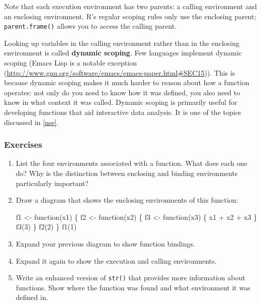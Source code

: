 \documentclass[oneside]{book}
\newenvironment{Shaded}{}{}
\newcommand{\KeywordTok} [1]{\textcolor[rgb]{0.00,0.44,0.13}{{#1}}}
\newcommand{\DecValTok}  [1]{\textcolor[rgb]{0.25,0.63,0.44}{{#1}}}
\newcommand{\StringTok}  [1]{\textcolor[rgb]{0.25,0.44,0.63}{{#1}}}
\newcommand{\NormalTok}  [1]{{#1}}
\renewcommand{\href}[2]{#2 (\url{#1})}
\renewcommand{\hyperref}[2][???]{\autoref{#1}}
\begin{document}
Note that each execution environment has two parents: a calling
environment and an enclosing environment. R's regular scoping rules only
use the enclosing parent; \texttt{parent.frame()} allows you to access
the calling parent.

Looking up variables in the calling environment rather than in the
enclosing environment is called \textbf{dynamic scoping}. Few languages
implement dynamic scoping (Emacs Lisp is a
\href{http://www.gnu.org/software/emacs/emacs-paper.html\#SEC15}{notable
exception}). This is because dynamic scoping makes it much harder to
reason about how a function operates: not only do you need to know how
it was defined, you also need to know in what context it was called.
Dynamic scoping is primarily useful for developing functions that aid
interactive data analysis. It is one of the topics discussed in
\hyperref[nse]{non-standard evaluation}.

\subsubsection{Exercises}\label{exercises-2}

\begin{enumerate}
\def\labelenumi{\arabic{enumi}.}
\item
  List the four environments associated with a function. What does each
  one do? Why is the distinction between enclosing and binding
  environments particularly important?
\item
  Draw a diagram that shows the enclosing environments of this function:

\begin{Shaded}
\begin{Highlighting}[]
\NormalTok{f1 <-}\StringTok{ }\NormalTok{function(x1) \{}
  \NormalTok{f2 <-}\StringTok{ }\NormalTok{function(x2) \{}
    \NormalTok{f3 <-}\StringTok{ }\NormalTok{function(x3) \{}
      \NormalTok{x1 +}\StringTok{ }\NormalTok{x2 +}\StringTok{ }\NormalTok{x3}
    \NormalTok{\}}
    \KeywordTok{f3}\NormalTok{(}\DecValTok{3}\NormalTok{)}
  \NormalTok{\}}
  \KeywordTok{f2}\NormalTok{(}\DecValTok{2}\NormalTok{)}
\NormalTok{\}}
\KeywordTok{f1}\NormalTok{(}\DecValTok{1}\NormalTok{)}
\end{Highlighting}
\end{Shaded}
\item
  Expand your previous diagram to show function bindings.
\item
  Expand it again to show the execution and calling environments.
\item
  Write an enhanced version of \texttt{str()} that provides more
  information about functions. Show where the function was found and
  what environment it was defined in.
\end{enumerate}
\end{document}
